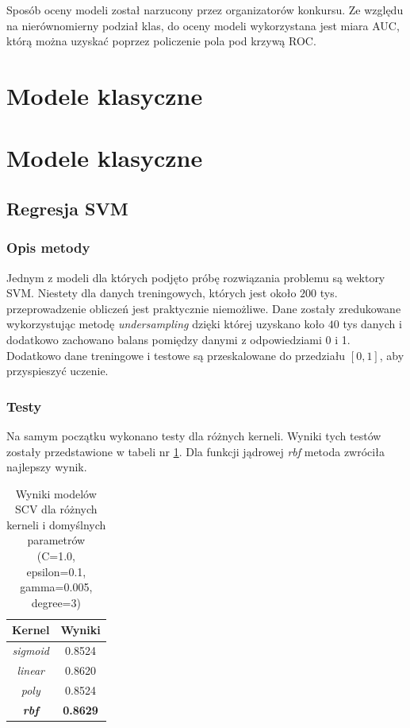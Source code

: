 \documentclass[12pt]{article}
\begin{document}
Sposób oceny modeli został narzucony przez organizatorów konkursu. Ze względu na nierównomierny podział klas, do oceny modeli wykorzystana jest miara AUC, którą można uzyskać poprzez policzenie pola pod krzywą ROC.


\section{Modele klasyczne}

\section{Modele klasyczne}

\subsection{Regresja SVM}
\subsubsection{Opis metody}
Jednym z modeli dla których podjęto próbę rozwiązania problemu są wektory SVM. Niestety dla danych treningowych, których jest około $200$ tys. przeprowadzenie obliczeń jest praktycznie niemożliwe. Dane zostały zredukowane wykorzystując metodę \textit{undersampling} dzięki której uzyskano koło $40$ tys danych i dodatkowo zachowano balans pomiędzy danymi z odpowiedziami 0 i 1. Dodatkowo dane treningowe i testowe są przeskalowane do przedziału $[0, 1]$, aby przyspieszyć uczenie.

\subsubsection{Testy}
Na samym początku wykonano testy dla różnych kerneli. Wyniki tych testów zostały przedstawione w tabeli nr \ref{tab:svm_kernels}. Dla funkcji jądrowej \textit{rbf} metoda zwróciła najlepszy wynik.
\begin{table}[H]
    \centering
    \begin{tabular}{|c|c|}
    \hline
    Kernel & Wyniki \\
    \hline
    \hline
    \textit{sigmoid} &	0.8524 \\
    \hline
    \textit{linear} &	0.8620 \\
    \hline
    \textit{poly} &	0.8524 \\
    \hline
    \textbf{\textit{rbf}} &	\textbf{0.8629} \\
    \hline
    \end{tabular}
    \caption{Wyniki modelów SCV dla różnych kerneli i domyślnych parametrów (C=1.0, epsilon=0.1, gamma=0.005, degree=3)}
    \label{tab:svm_kernels}
\end{table}
\end{document}
